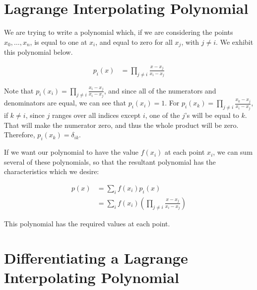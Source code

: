 \documentclass{article}
\begin{document}
\section{Lagrange Interpolating Polynomial}

We are trying to write a polynomial which, if we are considering
	the points $x_0, \dots, x_n$, is equal to one at $x_i$,
	and equal to zero for all $x_j$, with $j \neq i$.
We exhibit this polynomial below.

\begin{align}
p_i(x) & = \prod_{j \neq i} \frac{x - x_j}{x_i - x_j}
\end{align}

Note that $p_i(x_i) = \prod_{j \neq i} \frac{x_i - x_j}{x_i - x_j}$,
	and since all of the numerators and denominators are equal,
	we can see that $p_i(x_i) = 1$.
For $p_i(x_k) = \prod_{j \neq i} \frac{x_k - x_j}{x_i - x_j}$,
	if $k \neq i$, since $j$ ranges over all indices except $i$,
	one of the $j$'s will be equal to $k$.
That will make the numerator zero, and thus the whole product
	will be zero.
Therefore, $p_i(x_k) = \delta_{ik}$.

If we want our polynomial to have the value $f(x_i)$ at each
	point $x_i$, we can sum several of these polynomials, so that
	the resultant polynomial has the characteristics which we desire:

\begin{align}
p(x) & = \sum_i f(x_i) p_i(x) \\
& = \sum_i f(x_i) 
	\left( \prod_{j \neq i} \frac{x-x_j}{x_i-x_j} \right)
\end{align}

This polynomial has the required values at each point.

\section{Differentiating a Lagrange Interpolating Polynomial}
\end{document}

